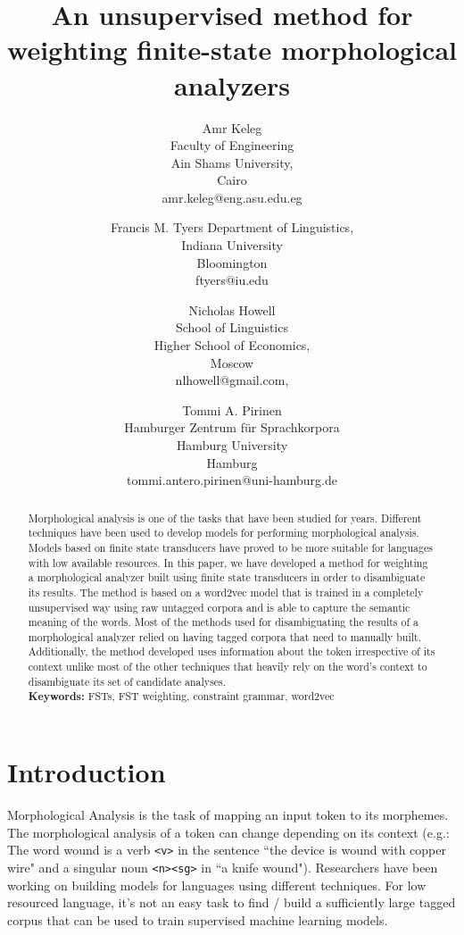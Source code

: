 \documentclass[free]{flammie}
\title{An unsupervised method for weighting finite-state morphological analyzers
\footnotepubrights{LREC proceedings is CC-BY-NC, copyrighted to ELRA, see
\url{http://www.lrec-conf.org/proceedings/lrec2020/pdf/2020.lrec-1.474.pdf} for
original}}
\author{Amr Keleg \\
    Faculty of Engineering \\
    Ain Shams University, \\
    Cairo \\
    amr.keleg@eng.asu.edu.eg \\
    \and
    Francis M. Tyers
    Department of Linguistics, \\
    Indiana University \\
    Bloomington    \\
    ftyers@iu.edu\\
    \and
    Nicholas Howell \\
    School of Linguistics\\
    Higher School of Economics, \\
    Moscow \\
    nlhowell@gmail.com, \\
    \and
    Tommi A. Pirinen \\
    Hamburger Zentrum f{\"u}r Sprachkorpora \\
    Hamburg University \\
    Hamburg \\
    tommi.antero.pirinen@uni-hamburg.de
}
\begin{document}
\maketitle

\begin{abstract}
Morphological analysis is one of the tasks that have been studied for years.
Different techniques have been used to develop models for performing
morphological analysis. Models based on finite state transducers have proved to
be more suitable for languages with low available resources. In this paper, we
have developed a method for weighting a morphological analyzer built using
finite state transducers in order to disambiguate its results. The method is
based on a word2vec model that is trained in a completely unsupervised way using
raw untagged corpora and is able to capture the semantic meaning of the words.
Most of the methods used for disambiguating the results of a morphological
analyzer relied on having tagged corpora that need to manually built.
Additionally, the method developed uses information about the token irrespective
of its context unlike most of the other techniques that heavily rely on the
word's context to disambiguate its set of candidate analyses.\\ \newline
    \textbf{Keywords:} FSTs, FST weighting, constraint grammar, word2vec
\end{abstract}

\section{Introduction}
Morphological Analysis is the task of mapping an input token to its morphemes.
The morphological analysis of a token can change depending on its context (e.g.:
The word wound is a verb \texttt{<v>} in the sentence ``the device is wound with
copper wire" and a singular noun \texttt{<n><sg>} in ``a knife wound").
Researchers have been working on building models for languages using different
techniques. For low resourced language, it's not an easy task to find / build a
sufficiently large tagged corpus that can be used to train supervised machine
learning models.
\end{document}
